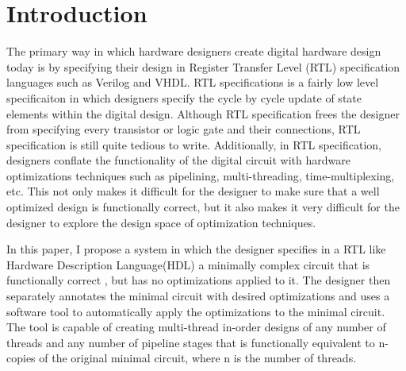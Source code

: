 \section{Introduction}
The primary way in which hardware designers create digital hardware design today is by specifying their design in Register Transfer Level (RTL) specification languages such as Verilog and VHDL. RTL specifications is a fairly low level specificaiton in which designers specify the cycle by cycle update of state elements within the digital design. Although RTL specification frees the designer from specifying every transistor or logic gate and their connections, RTL specification is still quite tedious to write. Additionally, in RTL specification, designers conflate the functionality of the digital circuit with hardware optimizations techniques such as pipelining, multi-threading, time-multiplexing, etc. This not only makes it difficult for the designer to make sure that a well optimized design is functionally correct, but it also makes it very difficult for the designer to explore the design space of optimization techniques.

In this paper, I propose a system in which the designer specifies in a RTL like Hardware Description Language(HDL) a minimally complex circuit that is functionally correct , but has no optimizations applied to it. The designer then separately annotates the minimal circuit with desired optimizations and uses a software tool to automatically apply the optimizations to the minimal circuit. The tool is capable of creating multi-thread in-order designs of any number of threads and any number of pipeline stages that is functionally equivalent to n-copies of the original minimal circuit, where n is the number of threads.

